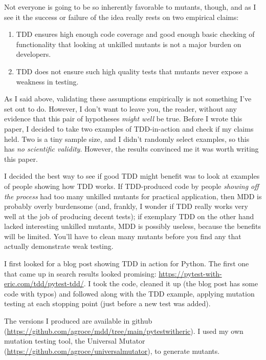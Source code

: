 \documentclass[sigplan,screen]{acmart}
\begin{document}
Not everyone is going to be so inherently favorable to mutants,
though, and as I see it the success or failure of the idea really
rests on two empirical claims:

\begin{enumerate}
  \item TDD ensures high enough code coverage and good enough basic
    checking of functionality that looking at unkilled mutants is not
    a major burden on developers.
    \item TDD does not ensure such high quality tests that mutants
      never expose a weakness in testing.
    \end{enumerate}

    As I said above, validating these assumptions empirically is not
    something I've set out to do.  However, I don't want to leave you,
    the reader, without any evidence that this pair of hypotheses
    \emph{might well} be true.  Before I wrote this paper, I decided
    to take two examples of TDD-in-action and check if my claims
    held.  Two is a tiny sample size, and I didn't randomly select
    examples, so this has \emph{no scientific validity}.  However, the
    results convinced me it was worth writing this paper.

    I decided the best way to see if good TDD might benefit was to
    look at examples of people showing how TDD works.  If TDD-produced
    code by people \emph{showing off the process} had too many
    unkilled mutants for practical application, then MDD is probably
    overly burdensome (and, frankly, I wonder if TDD really works very
    well at the job of producing decent tests); if exemplary TDD
    on the other hand lacked interesting unkilled mutants, MDD is
    possibly useless, because the benefits will be limited.  You'll
    have to clean many mutants before you find any that actually
    demonstrate weak testing.

    I first looked for a blog post showing TDD in action for Python.
    The first one that came up in search results looked promising:
    \url{https://pytest-with-eric.com/tdd/pytest-tdd/}.  I took the
    code, cleaned it up (the blog post has some code with typos) and
    followed along with the TDD example, applying mutation testing at
    each stopping point (just before a new test was added).

    The versions I produced are available in github
    (\url{https://github.com/agroce/mdd/tree/main/pytestwitheric}).  I
    used my own mutation testing tool, the Universal
    Mutator~\cite{SyntaxUM}
    (\url{https://github.com/agroce/universalmutator}), to generate
    mutants.
\end{document}
